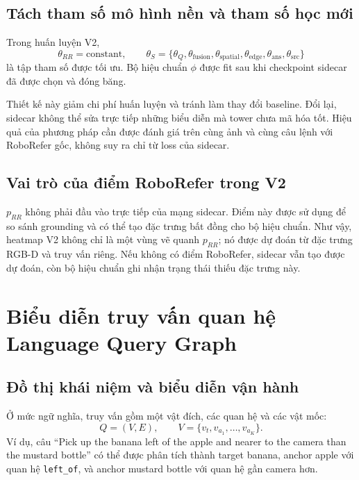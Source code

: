 \subsection{Tách tham số mô hình nền và tham số học mới}

Trong huấn luyện V2,
\begin{equation}
    \theta_{RR}=\mathrm{constant},\qquad
    \theta_S=\{\theta_Q,\theta_{\mathrm{fusion}},
    \theta_{\mathrm{spatial}},\theta_{\mathrm{edge}},
    \theta_{\mathrm{ans}},\theta_{\mathrm{src}}\}
\end{equation}
là tập tham số được tối ưu. Bộ hiệu chuẩn $\phi$ được fit sau khi
checkpoint sidecar đã được chọn và đóng băng.

Thiết kế này giảm chi phí huấn luyện và tránh làm thay đổi baseline.
Đổi lại, sidecar không thể sửa trực tiếp những biểu diễn mà tower
chưa mã hóa tốt. Hiệu quả của phương pháp cần được đánh giá trên cùng
ảnh và cùng câu lệnh với RoboRefer gốc, không suy ra chỉ từ loss của
sidecar.

\subsection{Vai trò của điểm RoboRefer trong V2}

$p_{RR}$ không phải đầu vào trực tiếp của mạng sidecar. Điểm này
được sử dụng để so sánh grounding và có thể tạo đặc trưng bất đồng
cho bộ hiệu chuẩn. Như vậy, heatmap V2 không chỉ là một vùng vẽ quanh
$p_{RR}$; nó được dự đoán từ đặc trưng RGB-D và truy vấn riêng.
Nếu không có điểm RoboRefer, sidecar vẫn tạo được dự đoán, còn bộ
hiệu chuẩn ghi nhận trạng thái thiếu đặc trưng này.

\section{Biểu diễn truy vấn quan hệ Language Query Graph}
\label{sec:method-query-graph}

\subsection{Đồ thị khái niệm và biểu diễn vận hành}

Ở mức ngữ nghĩa, truy vấn gồm một vật đích, các quan hệ và các vật mốc:
\begin{equation}
    Q=(V,E),\qquad
    V=\{v_t,v_{a_1},\ldots,v_{a_K}\}.
\end{equation}
Ví dụ, câu “Pick up the banana left of the apple and nearer to the
camera than the mustard bottle” có thể được phân tích thành target
banana, anchor apple với quan hệ \texttt{left\_of}, và anchor mustard
bottle với quan hệ gần camera hơn.

